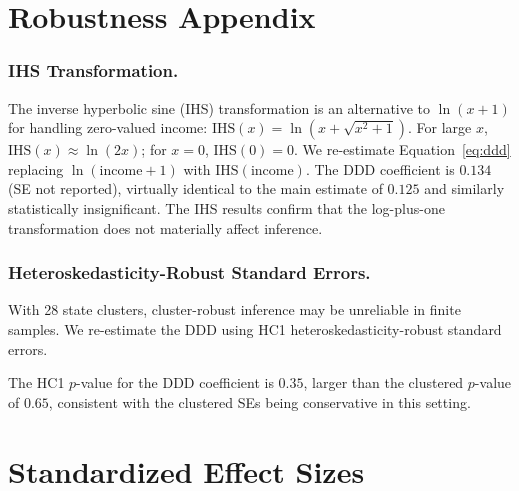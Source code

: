 \documentclass[12pt]{article}
\begin{document}
\section{Robustness Appendix}

\subsubsection*{IHS Transformation.}
The inverse hyperbolic sine (IHS) transformation is an alternative to $\ln(x+1)$ for handling zero-valued income: $\text{IHS}(x) = \ln(x + \sqrt{x^2+1})$. For large $x$, $\text{IHS}(x) \approx \ln(2x)$; for $x=0$, $\text{IHS}(0) = 0$. We re-estimate Equation~\ref{eq:ddd} replacing $\ln(\text{income}+1)$ with $\text{IHS}(\text{income})$. The DDD coefficient is $0.134$ (SE not reported), virtually identical to the main estimate of $0.125$ and similarly statistically insignificant. The IHS results confirm that the log-plus-one transformation does not materially affect inference.

\subsubsection*{Heteroskedasticity-Robust Standard Errors.}
{\sloppy With 28 state clusters, cluster-robust inference may be unreliable in finite samples. We re-estimate the DDD using HC1 heteroskedasticity-robust standard errors.\par} The HC1 $p$-value for the DDD coefficient is $0.35$, larger than the clustered $p$-value of $0.65$, consistent with the clustered SEs being conservative in this setting.

\section{Standardized Effect Sizes}
\label{sec:sde}


\end{document}
